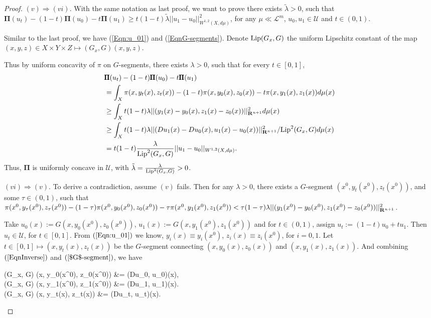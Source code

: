 \begin{proof}
	$(v)\Rightarrow (vi).$ With the same notation as last proof, we want to prove there exists  
	$\tilde{\lambda}>0$, such that $\pmb \Pi(u_t) - (1-t) \pmb \Pi(u_0) - t\pmb \Pi(u_1)\ge t(1-t)\tilde{\lambda}||u_1-u_0||^2_{W^{1,2}(X,d\mu)}$, for any $\mu\ll \mathcal{L}^m$, $u_0, u_1 \in \mathcal{U}$ and $t\in (0,1)$. 
	
	Similar to the last proof, we have (\ref{Eqn:u_01}) and (\ref{EqnG-segments}). Denote $\Lip(G_x,G)$ the uniform Lipschitz constant of the map $(x,y,z)\in X\times Y\times Z \longmapsto (G_x,G)(x,y,z)$.

	Thus by uniform concavity of $\pi$ on $G$-segments, there exists  
	$\lambda>0$, such that for every $t \in [0,1]$,
	\begin{align*}
	&\pmb \Pi (u_t)-(1-t)\pmb \Pi (u_0)- t \pmb \Pi(u_1)\\
	&= \int_X \pi(x, y_t(x), z_t(x)) - (1-t)\pi(x, y_0(x), z_0(x)) - t\pi(x, y_1(x), z_1(x)) d \mu (x)\\
	&\ge \int_{X} t(1-t)\lambda||(y_1(x)-y_0(x),z_1(x)-z_0(x))||^2_{\R^{n+1}} d\mu (x)\\
	&\ge \int_{X} t(1-t)\lambda||(Du_1(x)-Du_0(x),u_1(x)-u_0(x))||^2_{\R^{n+1}}/{\Lip}^2(G_x,G) d\mu (x)\\
	&= t(1-t)\frac{\lambda}{\Lip^2(G_x,G)} ||u_1-u_0||_{W^{1,2}(X,d\mu)}.
	\end{align*}
	Thus, $\pmb \Pi $ is uniformly concave in $\mathcal{U}$, with $\tilde{\lambda} = \frac{\lambda}{\Lip^2(G_x,G)} >0$.\medskip
	
	$(vi)\Rightarrow (v).$ To derive a contradiction, assume $(v)$ fails.  Then for any $\lambda>0$, there exists a $G$-segment $(x^0, y_t(x^0), z_t(x^0))$, and some $\tau \in (0,1)$, such that $\pi(x^0, y_{\tau}(x^0), z_{\tau}(x^0)) -  (1-\tau)\pi(x^0, y_{0}(x^0),z_{0}(x^0))-\tau \pi(x^0, y_{1}(x^0), z_{1}(x^0)) < \tau (1-\tau)\lambda ||(y_{1}(x^0)-y_{0}(x^0), z_{1}(x^0)-z_{0}(x^0))||^2_{{\mathbf R}^{n+1}}$.
	
	Take $u_0(x) := G(x, y_{0}(x^0), z_{0}(x^0))$, $u_1(x):= G(x, y_{1}(x^0), z_{1}(x^0))$ and for $t\in (0,1)$, assign $u_{t} := (1-t)u_0 +t u _1$. Then $ u_{t} \in \mathcal{U}$, for $t \in [0,1]$.  From $(\ref{Eqn:u_01})$ we know, $y_i(x)\equiv y_i(x^0)$, $z_i(x)\equiv z_i(x^0)$, for $i=0,1$.  Let $t\in [0,1] \longmapsto (x, y_t(x), z_t(x))$ be the $G$-segment connecting $(x, y_0(x), z_0(x))$ and $(x, y_1(x), z_1(x))$. And combining $(\ref{EqnInverse})$ and $(\ref{$G$-segment})$, we have
	\begin{flalign*}
	(G_x, G) (x, y_{0}(x^0), z_{0}(x^0)) &= (Du_0, u_0)(x),\\
	(G_x, G) (x, y_{1}(x^0), z_{1}(x^0)) &= (Du_1, u_1)(x).\\
	(G_x, G) (x, y_{t}(x), z_{t}(x)) &= (Du_{t}, u_{t})(x).
	\end{flalign*}
	

\end{proof}
